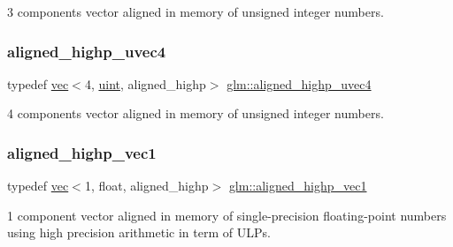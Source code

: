 3 components vector aligned in memory of unsigned integer numbers. 

\mbox{\label{group__gtc__type__aligned_ga85553b476297f73c07bf3228ffb02d81}} 
\subsubsection{\texorpdfstring{aligned\+\_\+highp\+\_\+uvec4}{aligned\_highp\_uvec4}}
{\footnotesize\ttfamily typedef \hyperlink{structglm_1_1vec}{vec}$<$4, \hyperlink{group__core__precision_ga4fd29415871152bfb5abd588334147c8}{uint}, aligned\+\_\+highp$>$ \hyperlink{group__gtc__type__aligned_ga85553b476297f73c07bf3228ffb02d81}{glm\+::aligned\+\_\+highp\+\_\+uvec4}}



4 components vector aligned in memory of unsigned integer numbers. 

\mbox{\label{group__gtc__type__aligned_ga8da7535c1fe488b2b9a29c0c05e7b17e}} 
\subsubsection{\texorpdfstring{aligned\+\_\+highp\+\_\+vec1}{aligned\_highp\_vec1}}
{\footnotesize\ttfamily typedef \hyperlink{structglm_1_1vec}{vec}$<$1, float, aligned\+\_\+highp$>$ \hyperlink{group__gtc__type__aligned_ga8da7535c1fe488b2b9a29c0c05e7b17e}{glm\+::aligned\+\_\+highp\+\_\+vec1}}



1 component vector aligned in memory of single-\/precision floating-\/point numbers using high precision arithmetic in term of U\+L\+Ps. 

\mbox{\label{group__gtc__type__aligned_ga7467c1a16f31911de3b927338434af6d}} 
